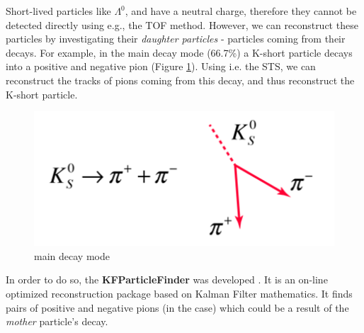 Short-lived particles like $\Lambda^0$, and \PKshort have a neutral charge, therefore they cannot be detected directly using e.g., the TOF method. However, we can reconstruct these particles by investigating their \emph{daughter particles} - particles coming from their decays. For example, in the main decay mode (66.7\%) a K-short particle decays into a positive and negative pion (Figure \ref{ks decay}). Using i.e. the STS, we can reconstruct the tracks of pions coming from this decay, and thus reconstruct the K-short particle.

\begin{figure}[H]
\centering
    \includegraphics[width=.4\textwidth]{img/kdecay1.png}
    \caption{\PKshort main decay mode \cite{kdecay1}}
    \label{ks decay}
\end{figure}

In order to do so, the \textbf{KFParticleFinder} was developed \cite{kfp}. It is an on-line optimized reconstruction package based on Kalman Filter mathematics. It finds pairs of positive and negative pions (in the \PKshort case) which could be a result of the \emph{mother} particle's decay.
